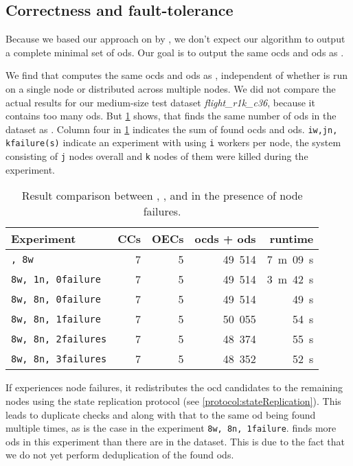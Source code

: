 \subsection{Correctness and fault-tolerance}\label{sec:evaluation:correctness}

  Because we based our approach on \ocddiscover{} by \citeauthor{consonni}, we don't expect our algorithm to output a complete minimal set of \glspl{od}.
  Our goal is to output the same \glspl{ocd} and \glspl{od} as \ocddiscover{}.

  We find that \dodo{} computes the same \glspl{ocd} and \glspl{od} as \ocddiscover{}, independent of whether \dodo{} is run on a single node or distributed across multiple nodes.
  We did not compare the actual results for our medium-size test dataset \textit{flight\_r1k\_c36}, because it contains too many \glspl{od}.
  But \cref{tab:results} shows, that \dodo{} finds the same number of \glspl{od} in the dataset as \ocddiscover{}.
  Column four in \cref{tab:results} indicates the sum of found \glspl{ocd} and \glspl{od}.
  \texttt{iw,jn, kfailure(s)} indicate an experiment with \dodo{} using \texttt{i} workers per node, the system consisting of \texttt{j} nodes overall and \texttt{k} nodes of them were killed during the experiment.

  \begin{table}
    \centering
    \begin{tabular}{lrrrr}
      \toprule
      \textbf{Experiment} & \textbf{CCs} & \textbf{OECs} & \textbf{\glspl{ocd} + \glspl{od}} & \textbf{runtime} \\
      \midrule
      \texttt{\ocddiscover{}, 8w} & 7 & 5 & 49~514 & 7~m~09~s \\
      \texttt{8w, 1n, 0failure} & 7 & 5 & 49~514 & 3~m~42~s \\
      \texttt{8w, 8n, 0failure} & 7 & 5 & 49~514 & 49~s \\
      \texttt{8w, 8n, 1failure} & 7 & 5 & 50~055 & 54~s \\
      \texttt{8w, 8n, 2failures} & 7 & 5 & 48~374 & 55~s \\
      \texttt{8w, 8n, 3failures} & 7 & 5 & 48~352 & 52~s \\
      \bottomrule
    \end{tabular}
    \caption{Result comparison between \ocddiscover{}, \dodo{}, and \dodo{} in the presence of node failures.}
    \label{tab:results}
  \end{table}

  If \dodo{} experiences node failures, it redistributes the \gls{ocd} candidates to the remaining nodes using the state replication protocol (see \cref{protocol:stateReplication}).
  This leads to duplicate checks and along with that to the same \gls{od} being found multiple times, as is the case in the experiment \texttt{8w, 8n, 1failure}.
  \dodo{} finds more \glspl{od} in this experiment than there are in the dataset.
  This is due to the fact that we do not yet perform deduplication of the found \glspl{od}.

